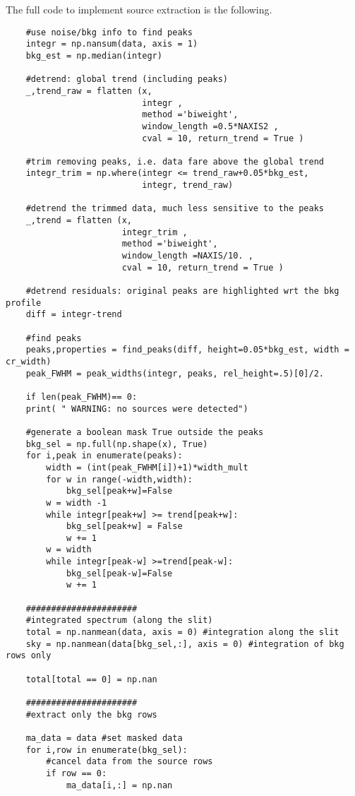 The full code to implement source extraction is the following.
\begin{lstlisting}
	#use noise/bkg info to find peaks
	integr = np.nansum(data, axis = 1)
	bkg_est = np.median(integr)
	
	#detrend: global trend (including peaks)
	_,trend_raw = flatten (x,
	                       integr ,
	                       method ='biweight',
   	                       window_length =0.5*NAXIS2 ,
	                       cval = 10, return_trend = True )
	
	#trim removing peaks, i.e. data fare above the global trend
	integr_trim = np.where(integr <= trend_raw+0.05*bkg_est,
	                       integr, trend_raw)
	
	#detrend the trimmed data, much less sensitive to the peaks
	_,trend = flatten (x,
	                   integr_trim ,
	                   method ='biweight',
	                   window_length =NAXIS/10. ,
	                   cval = 10, return_trend = True )
	
	#detrend residuals: original peaks are highlighted wrt the bkg profile
	diff = integr-trend
	
	#find peaks
	peaks,properties = find_peaks(diff, height=0.05*bkg_est, width = cr_width)
	peak_FWHM = peak_widths(integr, peaks, rel_height=.5)[0]/2.
	
	if len(peak_FWHM)== 0:
	print( " WARNING: no sources were detected")
	
	#generate a boolean mask True outside the peaks
	bkg_sel = np.full(np.shape(x), True)
	for i,peak in enumerate(peaks):
		width = (int(peak_FWHM[i])+1)*width_mult
		for w in range(-width,width):
			bkg_sel[peak+w]=False
		w = width -1
		while integr[peak+w] >= trend[peak+w]:
			bkg_sel[peak+w] = False
			w += 1
		w = width
		while integr[peak-w] >=trend[peak-w]:
			bkg_sel[peak-w]=False
			w += 1
	
	######################
	#integrated spectrum (along the slit)
	total = np.nanmean(data, axis = 0) #integration along the slit
	sky = np.nanmean(data[bkg_sel,:], axis = 0) #integration of bkg rows only
	
	total[total == 0] = np.nan
	
	######################
	#extract only the bkg rows
	
	ma_data = data #set masked data
	for i,row in enumerate(bkg_sel):
		#cancel data from the source rows
		if row == 0:
			ma_data[i,:] = np.nan
\end{lstlisting}

